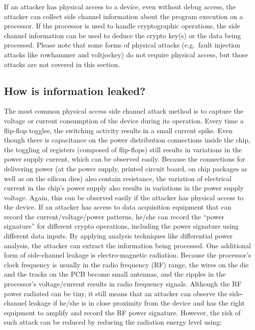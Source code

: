 \documentclass[
  a4paper,
]{report}
\begin{document}
If an attacker has physical access to a device, even without debug
access, the attacker can collect side channel information about the
program execution on a processor. If the processor is used to handle
cryptographic operations, the side channel information can be used to
deduce the crypto key(s) or the data being processed. Please note that
some forms of physical attacks (e.g.~fault injection attacks like
rowhammer and voltjockey) do not require physical access, but those
attacks are not covered in this section.

\hypertarget{how-is-information-leaked}{%
\subsection{How is information
leaked?}\label{how-is-information-leaked}}

The most common physical access side channel attack method is to capture
the voltage or current consumption of the device during its operation.
Every time a flip-flop toggles, the switching activity results in a
small current spike. Even though there is capacitance on the power
distribution connections inside the chip, the toggling of registers
(composed of flip-flops) still results in variations in the power supply
current, which can be observed easily. Because the connections for
delivering power (at the power supply, printed circuit board, on chip
packages as well as on the silicon dies) also contain resistance, the
variation of electrical current in the chip's power supply also results
in variations in the power supply voltage. Again, this can be observed
easily if the attacker has physical access to the device. If an attacker
has access to data acquisition equipment that can record the
current/voltage/power patterns, he/she can record the ``power
signature'' for different crypto operations, including the power
signature using different data inputs. By applying analysis techniques
like differential power analysis, the attacker can extract the
information being processed. One additional form of side-channel leakage
is electro-magnetic radiation. Because the processor's clock frequency
is usually in the radio frequency (RF) range, the wires on the die and
the tracks on the PCB become small antennas, and the ripples in the
processor's voltage/current results in radio frequency signals. Although
the RF power radiated can be tiny, it still means that an attacker can
observe the side-channel leakage if he/she is in close proximity from
the device and has the right equipment to amplify and record the RF
power signature. However, the risk of such attack can be reduced by
reducing the radiation energy level using:
\end{document}
